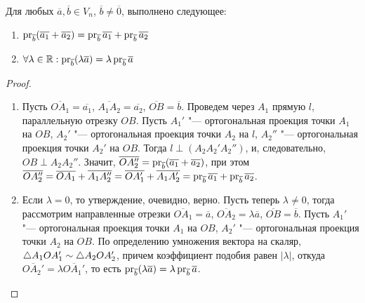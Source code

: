     \begin{proposition}
    	Для любых $\overline{a}, \overline{b} \in V_n$, $\overline{b} \ne \overline{0}$, выполнено следующее:
    	\begin{enumerate}
    		\item $\operatorname{pr}_{\overline{b}}(\overline{a_1} + \overline{a_2}) = \operatorname{pr}_{\overline{b}}\overline{a_1} + \operatorname{pr}_{\overline{b}}\overline{a_2}$
    		\item $\forall \lambda \in \mathbb{R}: \operatorname{pr}_{\overline{b}}(\lambda \overline{a}) = \lambda \operatorname{pr}_{\overline{b}}\overline{a}$
    	\end{enumerate}
    \end{proposition}
    
    \begin{proof}~
    	\begin{enumerate}
    		\item Пусть $\overline{OA_1} = \overline{a_1}$, $\overline{A_1A_2} = \overline{a_2}$, $\overline{OB} = \overline{b}$. Проведем через $A_1$ прямую $l$, параллельную отрезку $OB$. Пусть $A_1'$ "--- ортогональная проекция точки $A_1$ на $OB$, $A_2'$ "--- ортогональная проекция точки $A_2$ на $l$, $A_2''$ "--- ортогональная проекция точки $A_2'$ на $OB$. Тогда $l \perp (A_2A_2'A_2'')$, и, следовательно, $OB \perp A_2A_2''$. Значит, $\overline{OA_2''} = \operatorname{pr}_{\overline{b}}(\overline{a_1} + \overline{a_2})$, при этом $\overline{OA_2''} = \overline{OA_1} + \overline{A_1A_2''} \hm= \overline{OA_1'} + \overline{A_1A_2'} = \pr_{\overline{b}}\overline{a_1} + \pr_{\overline{b}}\overline{a_2}$.
    		
    		\item Если $\lambda = 0$, то утверждение, очевидно, верно. Пусть теперь $\lambda \ne 0$, тогда рассмотрим направленные отрезки $\overline{OA_1} = \overline{a}$, $\overline{OA_2} = \lambda\overline{a}$, $\overline{OB} = \overline{b}$. Пусть $A_1'$ "--- ортогональная проекция точки $A_1$ на $OB$, $A_2'$ "--- ортогональная проекция точки $A_2$ на $OB$. По определению умножения вектора на скаляр, $\triangle A_1OA_1' \hm{\sim} \triangle A_2OA_2'$, причем коэффициент подобия равен $|\lambda|$, откуда $\overline{OA_2'} = \lambda \overline{OA_1'}$, то есть $\pr_{\overline{b}}(\lambda \overline{a}) \hm{=} \lambda \pr_{\overline{b}}\overline{a}$.\qedhere
    	\end{enumerate}
    \end{proof}
    
